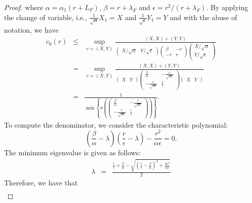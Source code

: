 \documentclass{article}
\theoremstyle{definition}
\begin{document}
\begin{proof}
where $\alpha = \alpha_1 (r + L_F)$, $\beta = r + \lambda_F$ and $\epsilon = r^2/(r + \lambda_F)$. By applying the change of variable, i.e., $\frac{1}{\sqrt{\alpha}} X_1 = X$ and $\frac{1}{\sqrt{\epsilon}} Y_1 = Y$ and with the abuse of notation, we have 
\begin{eqnarray} 
c_0(r) &\leq& \sup_{v = (X,Y)} \frac{(X,X) +  (Y,Y)}{\begin{pmatrix} X/\sqrt{\alpha} & Y/\sqrt{\epsilon} \end{pmatrix} \begin{pmatrix} \beta & -r \\ -r & r \end{pmatrix} \begin{pmatrix} X/\sqrt{\alpha} \\ Y/\sqrt{\epsilon} \end{pmatrix}} \\  
&=& \sup_{v = (X,Y)} \frac{ (X,X) + (Y,Y) }{\begin{pmatrix} X & Y \end{pmatrix} \begin{pmatrix} \frac{\beta}{\alpha} & -\frac{r}{\sqrt{\alpha \epsilon}} \\ 
-\frac{r}{\sqrt{\alpha \epsilon}} & \frac{r}{\epsilon} \end{pmatrix} \begin{pmatrix} X & Y \end{pmatrix}} \\
&=& \frac{1}{\min \left\{ \sigma \left ( 
\begin{pmatrix} \frac{\beta}{\alpha} & -\frac{r}{\sqrt{\alpha \epsilon}} \\ 
-\frac{r}{\sqrt{\alpha \epsilon}} & \frac{r}{\epsilon} \end{pmatrix} \right ) \right \}}. 
\end{eqnarray}
To compute the denominator, we consider the characteristic polynomial: 
\begin{equation}
\left ( \frac{\beta}{\alpha} - \lambda \right ) \left ( \frac{r}{\epsilon} - \lambda \right ) - \frac{r^2}{\alpha \epsilon} = 0.  
\end{equation}
The minimum eigenvalue is given as follows: 
\begin{eqnarray*}
\lambda &=& \frac{\frac{r}{\epsilon} + \frac{\beta}{\alpha} - \sqrt{ \left ( \frac{r}{\epsilon} - \frac{\beta}{\alpha} \right )^2 + \frac{4r^2}{\alpha \epsilon} } }{2} 
\end{eqnarray*}
Therefore, we have that
\begin{eqnarray}

\end{eqnarray}
\end{proof}
\end{document}
